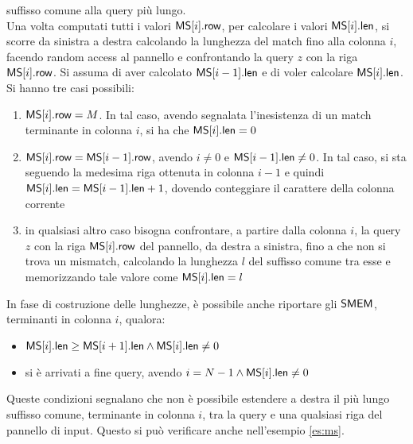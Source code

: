 suffisso comune alla query più lungo.\\
Una volta computati tutti i valori $\mbox{\rm {\sf MS}}[i].\mbox{\rm {\sf row}}$, per calcolare i valori
$\mbox{\rm {\sf MS}}[i].\mbox{\rm {\sf len}}$,
si scorre da sinistra a destra calcolando la lunghezza del match fino alla
colonna $i$, facendo random
access al pannello e confrontando la query $z$ con la riga $\mbox{\rm {\sf MS}}[i].\mbox{\rm {\sf row}}$. Si
assuma di aver calcolato $\mbox{\rm {\sf MS}}[i-1].\mbox{\rm {\sf len}}$ e di voler calcolare
$\mbox{\rm {\sf MS}}[i].\mbox{\rm {\sf len}}$. 
Si hanno tre casi possibili:
\begin{enumerate}
  \item $\mbox{\rm {\sf MS}}[i].\mbox{\rm {\sf row}}=M$. In tal caso, avendo segnalata l'inesistenza di un
  match terminante in colonna $i$, si ha che $\mbox{\rm {\sf MS}}[i].\mbox{\rm {\sf len}}=0$
  \item $\mbox{\rm {\sf MS}}[i].\mbox{\rm {\sf row}}=\mbox{\rm {\sf MS}}[i-1].\mbox{\rm {\sf row}}$, avendo $i\neq 0$ e $\mbox{\rm {\sf MS}}[i-1].\mbox{\rm {\sf len}}\neq 0$.
  In tal caso,
  si sta seguendo la medesima riga ottenuta in colonna $i-1$ e quindi
  $\mbox{\rm {\sf MS}}[i].\mbox{\rm {\sf len}}=\mbox{\rm {\sf MS}}[i-1].\mbox{\rm {\sf len}}+1$, dovendo conteggiare il carattere
  della colonna corrente
  \item in qualsiasi altro caso bisogna confrontare, a partire dalla colonna
  $i$, la query 
  $z$ con la riga $\mbox{\rm {\sf MS}}[i].\mbox{\rm {\sf row}}$ del pannello, da destra a sinistra, fino a che
  non si trova un mismatch, calcolando la lunghezza $l$ del suffisso comune tra
  esse e memorizzando tale valore come $\mbox{\rm {\sf MS}}[i].\mbox{\rm {\sf len}}=l$
\end{enumerate}
In fase di costruzione delle lunghezze, è possibile anche riportare gli
$\mbox{\rm {\sf SMEM}}$, terminanti in colonna $i$, qualora:
\begin{itemize}
  \item $\mbox{\rm {\sf MS}}[i].\mbox{\rm {\sf len}}\geq \mbox{\rm {\sf MS}}[i+1].\mbox{\rm {\sf len}} \land \mbox{\rm {\sf MS}}[i].\mbox{\rm {\sf len}}\neq 0$
  \item si è arrivati a fine query, avendo $i=N-1\land \mbox{\rm {\sf MS}}[i].\mbox{\rm {\sf len}}\neq 0$
\end{itemize}
Queste condizioni segnalano che non è possibile estendere a destra il più lungo
suffisso comune, terminante in colonna $i$, tra la query e una qualsiasi riga del
pannello di input. 
Questo si può verificare anche nell'esempio \ref{es:ms}.
